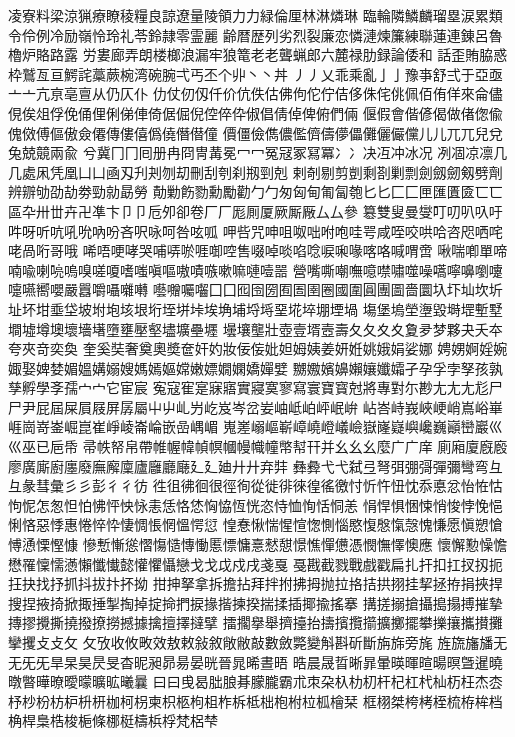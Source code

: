 凌寮料梁涼猟療瞭稜糧良諒遼量陵領⼒力緑倫厘林淋燐琳
臨輪隣鱗麟瑠塁涙累類令伶例冷励嶺怜玲礼苓鈴隷零霊麗
齢暦歴列劣烈裂廉恋憐漣煉簾練聯蓮連錬呂魯櫓炉賂路露
労婁廊弄朗楼榔浪漏牢狼篭⽼老聾蝋郎六麓禄肋録論倭和
話歪賄脇惑枠鷲亙亘鰐詫藁蕨椀湾碗腕弌丐丕个丱⼂丶丼
⼃丿乂乖乘亂⼅亅豫亊舒弍于亞亟⼇亠亢亰亳亶从仍仄仆
仂仗仞仭仟价伉佚估佛佝佗佇佶侈侏侘佻佩佰侑佯來侖儘
俔俟俎俘俛俑俚俐俤俥倚倨倔倪倥倅伜俶倡倩倬俾俯們倆
偃假會偕偐偈做偖偬偸傀傚傅傴傲僉僊傳僂僖僞僥僭僣僮
價僵儉儁儂儖儕儔儚儡儺儷儼儻⼉儿⺎兀兒兌兔兢竸兩兪
兮冀⼌冂囘册冉冏冑冓冕⼍冖冤冦冢冩冪⼎冫决冱冲冰况
冽凅凉凛⼏几處凩凭凰⼐凵凾刄刋刔刎刧刪刮刳刹剏剄剋
剌剞剔剪剴剩剳剿剽劍劔劒剱劈劑辨辧劬劭劼劵勁勍勗勞
勣勦飭勠勳勵勸⼓勹匆匈甸匍匐匏匕⼔匚⼕匣匯匱匳⼖匸
區卆卅丗卉卍凖卞⼙卩卮夘卻卷⼚厂厖厠厦厥厮厰⼛厶參
簒雙叟曼燮叮叨叭叺吁吽呀听吭吼吮吶吩吝呎咏呵咎呟呱
呷呰咒呻咀呶咄咐咆哇咢咸咥咬哄哈咨咫哂咤咾咼哘哥哦
唏唔哽哮哭哺哢唹啀啣啌售啜啅啖啗唸唳啝喙喀咯喊喟啻
啾喘喞單啼喃喩喇喨嗚嗅嗟嗄嗜嗤嗔嘔嗷嘖嗾嗽嘛嗹噎噐
營嘴嘶嘲嘸噫噤嘯噬噪嚆嚀嚊嚠嚔嚏嚥嚮嚶嚴囂嚼囁囃囀
囈囎囑囓⼞囗囮囹圀囿圄圉圈國圍圓團圖嗇圜圦圷圸坎圻
址坏坩埀垈坡坿垉垓垠垳垤垪垰埃埆埔埒埓堊埖埣堋堙堝
塲堡塢塋塰毀塒堽塹墅墹墟墫墺壞墻墸墮壅壓壑壗壙壘壥
壜壤壟壯壺壹壻壼壽夂⼡夊⼢夐夛梦夥夬夭夲夸夾竒奕奐
奎奚奘奢奠奧奬奩奸妁妝佞侫妣妲姆姨姜妍姙姚娥娟娑娜
娉娚婀婬婉娵娶婢婪媚媼媾嫋嫂媽嫣嫗嫦嫩嫖嫺嫻嬌嬋嬖
嬲嫐嬪嬶嬾孃孅孀孑孕孚孛孥孩孰孳孵學斈孺⼧宀它宦宸
寃寇寉寔寐寤實寢寞寥寫寰寶寳尅將專對尓尠⺐⼪尢尨⼫
尸尹屁屆屎屓屐屏孱屬⼬屮乢屶屹岌岑岔妛岫岻岶岼岷峅
岾峇峙峩峽峺峭嶌峪崋崕崗嵜崟崛崑崔崢崚崙崘嵌嵒嵎嵋
嵬嵳嵶嶇嶄嶂嶢嶝嶬嶮嶽嶐嶷嶼巉巍巓巒巖⼮巛巫已巵帋
帚帙帑帛帶帷幄幃幀幎幗幔幟幢幤幇幵并⺓⼳幺麼⼴广庠
廁廂廈廐廏廖廣廝廚廛廢廡廨廩廬廱廳廰⼵廴廸⼶廾弃弉
彝彜⼷弋弑弖弩弭弸彁彈彌彎弯⺔彑彖彗彙⼺彡彭⼻彳彷
徃徂彿徊很徑徇從徙徘徠徨徭徼忖忻忤忸忱忝悳忿怡恠怙
怐怩怎怱怛怕怫怦怏怺恚恁恪恷恟恊恆恍恣恃恤恂恬恫恙
悁悍惧悃悚悄悛悖悗悒悧悋惡悸惠惓悴忰悽惆悵惘慍愕愆
惶惷愀惴惺愃愡惻惱愍愎慇愾愨愧慊愿愼愬愴愽慂慄慳慷
慘慙慚慫慴慯慥慱慟慝慓慵憙憖憇憬憔憚憊憑憫憮懌懊應
懷懈懃懆憺懋罹懍懦懣懶懺懴懿懽懼懾戀⼽戈戉戍戌戔戛
戞戡截戮戰戲戳扁扎扞扣扛扠扨扼抂抉找抒抓抖拔抃抔拗
拑抻拏拿拆擔拈拜拌拊拂拇抛拉挌拮拱挧挂挈拯拵捐挾捍
搜捏掖掎掀掫捶掣掏掉掟掵捫捩掾揩揀揆揣揉插揶揄搖搴
搆搓搦搶攝搗搨搏摧摯摶摎攪撕撓撥撩撈撼據擒擅擇撻擘
擂擱擧舉擠擡抬擣擯攬擶擴擲擺攀擽攘攜攅攤攣攫⽁攴⺙
攵攷收攸畋效敖敕敍敘敞敝敲數斂斃變斛斟斫斷旃旆旁旄
旌旒旛旙⽆无⺛旡旱杲昊昃旻杳昵昶昴昜晏晄晉晁晞晝晤
晧晨晟晢晰暃暈暎暉暄暘暝曁暹曉暾暼曄暸曖曚曠昿曦曩
⽈曰曵曷朏朖朞朦朧霸朮朿朶杁朸朷杆杞杠杙杣杤枉杰枩
杼杪枌枋枦枡枅枷柯枴柬枳柩枸柤柞柝柢柮枹柎柆柧檜栞
框栩桀桍栲桎梳栫桙档桷桿梟梏梭梔條梛梃檮梹桴梵梠梺
